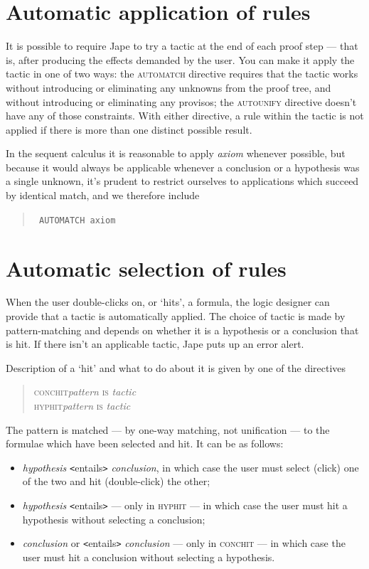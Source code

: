 \section{Automatic application of rules}

It is possible to require Jape to try a tactic at the end of each proof step --- that is, after producing the effects demanded by the user. You can make it apply the tactic in one of two ways: the \textsc{automatch} directive requires that the tactic works without introducing or eliminating any unknowns from the proof tree, and without introducing or eliminating any provisos; the \textsc{autounify} directive doesn't have any of those constraints. With either directive, a rule within the tactic is not applied if there is more than one distinct possible result.

In the sequent calculus it is reasonable to apply \textit{axiom} whenever possible, but because it would always be applicable whenever a conclusion or a hypothesis was a single unknown, it's prudent to restrict ourselves to applications which succeed by identical match, and we therefore include
\begin{quote}\tt\small
AUTOMATCH axiom
\end{quote}

\section{Automatic selection of rules}

When the user double-clicks on, or `hits', a formula, the logic designer can provide that a tactic is automatically applied. The choice of tactic is made by pattern-matching and depends on whether it is a hypothesis or a conclusion that is hit. If there isn't an applicable tactic, Jape puts up an error alert.

Description of a `hit' and what to do about it is given by one of the directives
\begin{quote}
\textsc{conchit\tab }\textit{pattern} \textsc{is} \textit{tactic}\\
\textsc{hyphit\tab }\textit{pattern} \textsc{is} \textit{tactic}
\end{quote}

The pattern is matched --- by one-way matching, not unification --- to the formulae which have been selected and hit. It can be as follows:
\begin{itemize}
\item \textit{hypothesis} \texttt{<}entails\texttt{>} \textit{conclusion}, in which case the user must select (click) one of the two and hit (double-click) the other;
\item \textit{hypothesis} \texttt{<}entails\texttt{>} --- only in \textsc{hyphit} --- in which case the user must hit a hypothesis without selecting a conclusion;
\item \textit{conclusion} or \texttt{<}entails\texttt{>} \textit{conclusion} --- only in \textsc{conchit} --- in which case the user must hit a conclusion without selecting a hypothesis.
\end{itemize}


